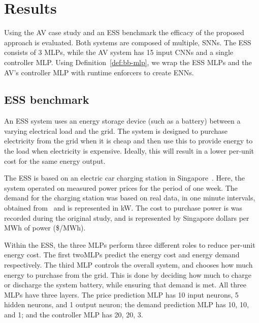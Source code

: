 
\section{Results}
\label{sec:resultsc4}

Using the \ac{AV} case study and an \ac{ESS} benchmark the efficacy of the proposed approach is evaluated.
Both systems are composed of multiple, \acfp{SNN}.
The \ac{ESS} consists of 3 \acfp{MLP}, while the \ac{AV} system has 15 input \acfp{CNN} and a single controller \ac{MLP}.
Using Definition~\ref{def:bb-mlp}, we wrap the \ac{ESS} \acp{MLP} and the \ac{AV}'s controller \ac{MLP} with runtime enforcers to create \acfp{ENN}.

\subsection{\acf{ESS} benchmark}

An \ac{ESS} system uses an energy storage device (such as a battery)
between a varying electrical load and the grid.
The system is designed to purchase electricity from the grid when it is cheap and then use this to provide energy to the load when electricity is expensive. 
Ideally, this will result in a lower per-unit cost for the same energy output.

The \ac{ESS} is based on an electric car charging station in Singapore~\cite{chaudhari2017hybrid}.
Here, the system operated on measured power prices for the period of one week.
The demand for the charging station was based on real data, in one
minute intervals, obtained from~\cite{authority2012singapore} and is represented in kW.
The cost to purchase power is was recorded during the original study, and is represented by Singapore dollars per MWh of power (\$/MWh).

Within the \ac{ESS}, the three \acp{MLP} perform three different roles to reduce per-unit energy cost.
The first two\acp{MLP} predict the energy cost and energy demand respectively.
The third \ac{MLP} controls the overall system, and chooses how much energy to purchase from the grid.
 This is done by deciding how much to charge or discharge the system battery, while ensuring that demand is met.
All three \acp{MLP} have three layers.
The price prediction \ac{MLP} has 10 input neurons, 5 hidden neurons, and 1 output neuron; the demand prediction \ac{MLP} has 10, 10, and 1; and the controller \ac{MLP} has 20, 20, 3.

